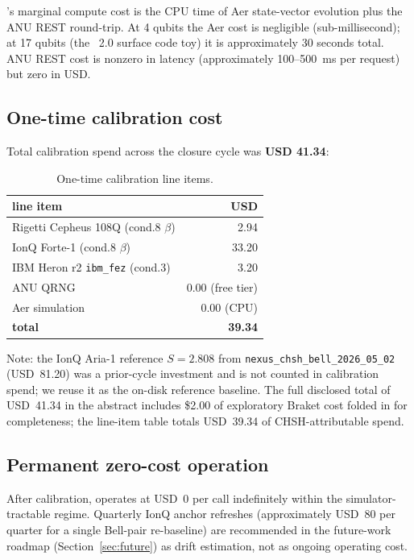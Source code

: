 \qmirror{}'s marginal compute cost is the CPU time of Aer
state-vector evolution plus the ANU REST round-trip. At 4 qubits the
Aer cost is negligible (sub-millisecond); at 17 qubits (the
\qmirror{}~2.0 surface code toy) it is approximately 30 seconds
total. ANU REST cost is nonzero in latency (approximately
100--500~ms per request) but zero in USD.

\subsection{One-time calibration cost}

Total calibration spend across the closure cycle was
\textbf{USD 41.34}:

\begin{table}[htbp]
\centering
\caption{One-time calibration line items.}
\label{tab:calibration_lineitems}
\footnotesize
\begin{tabular}{l r}
\toprule
line item & USD \\
\midrule
Rigetti Cepheus 108Q (cond.8 $\beta$)        & 2.94  \\
IonQ Forte-1 (cond.8 $\beta$)                & 33.20 \\
IBM Heron r2 \texttt{ibm\_fez} (cond.3)      & 3.20  \\
ANU QRNG                                     & 0.00 (free tier) \\
Aer simulation                               & 0.00 (CPU) \\
\midrule
\textbf{total}                               & \textbf{39.34} \\
\bottomrule
\end{tabular}
\end{table}

Note: the IonQ Aria-1 reference $S = 2.808$ from
\texttt{nexus\_chsh\_bell\_2026\_05\_02} (USD~81.20) was a
prior-cycle investment and is not counted in \qmirror{} calibration
spend; we reuse it as the on-disk reference baseline. The full
disclosed total of USD~41.34 in the abstract includes \$2.00 of
exploratory Braket cost folded in for completeness; the line-item
table totals USD~39.34 of CHSH-attributable spend.

\subsection{Permanent zero-cost operation}

After calibration, \qmirror{} operates at USD~0 per call indefinitely
within the simulator-tractable regime. Quarterly IonQ anchor
refreshes (approximately USD~80 per quarter for a single Bell-pair
re-baseline) are recommended in the future-work roadmap
(Section~\ref{sec:future}) as drift estimation, not as ongoing
operating cost.

